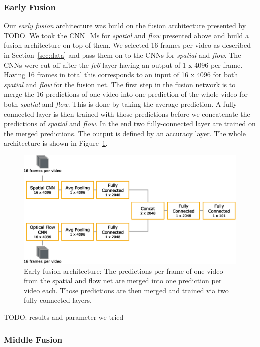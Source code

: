 \subsubsection{Early Fusion}
Our \emph{early fusion} architecture was build on the fusion architecture presented by TODO.
We took the CNN\_Ms for \emph{spatial} and \emph{flow} presented above and build a fusion architecture on top of them.
We selected 16 frames per video as described in Section~\ref{sec:data} and pass them on to the CNNs for \emph{spatial} and \emph{flow}.
The CNNs were cut off after the \textit{fc6}-layer having an output of 1 x 4096 per frame.
Having 16 frames in total this corresponds to an input of 16 x 4096 for both \emph{spatial} and \emph{flow} for the fusion net.
The first step in the fusion network is to merge the 16 predictions of one video into one prediction of the whole video for both \emph{spatial} and \emph{flow}.
This is done by taking the average prediction.
A fully-connected layer is then trained with those predictions before we concatenate the predictions of \emph{spatial} and \emph{flow}.
In the end two fully-connected layer are trained on the merged predictions.
The output is defined by an accuracy layer.
The whole architecture is shown in Figure~\ref{fig:early_fusion}.
\begin{figure}[!htb]
	\centering
	\includegraphics[scale=.7]{images/early_fusion.eps}
	\caption{Early fusion architecture: The predictions per frame of one video from the spatial and flow net are merged into one prediction per video each. Those predictions are then merged and trained via two fully connected layers.}
	\label{fig:early_fusion}
\end{figure}

TODO: results and parameter we tried

\subsubsection{Middle Fusion}


